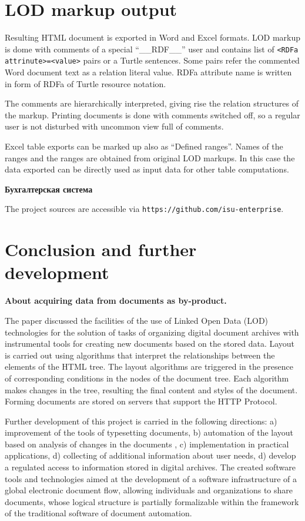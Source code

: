 \documentclass[conference,a4paper]{IEEEtran}
\providecommand\url[1]{\texttt{#1}}
\begin{document}
\section{LOD markup output}
\label{sec:lod-out}

Resulting HTML document is exported in Word and Excel formats.  LOD markup is dome with comments of a special ``\_\_RDF\_\_'' user and contains list of \texttt{<RDFa attrinute>=<value>} pairs or a Turtle sentences.  Some pairs refer the commented Word document text as a relation literal value.  RDFa attribute name is written in form of RDFa of Turtle resource notation.

The comments are hierarchically interpreted, giving rise the relation structures of the markup.  Printing documents is done with comments switched off, so a regular user is not disturbed with uncommon view full of comments.

Excel table exports can be marked up also as ``Defined ranges''.  Names of the ranges and the ranges are obtained from original LOD markups.  In this case the data exported can be directly used as input data for other table computations.

\textbf{Бухгалтерская система}

The project sources are accessible via \url{https://github.com/isu-enterprise}.

\section{Conclusion and further development}
\label{sec:conc}

\textbf{About acquiring data from documents as by-product.}

The paper discussed the facilities of the use of Linked Open Data (LOD) technologies for the solution of tasks of organizing digital document archives with instrumental tools for creating new documents based on the stored data.  Layout is carried out using algorithms that interpret the relationships between the elements of the HTML tree.  The layout algorithms are triggered in the presence of corresponding conditions in the nodes of the document tree. Each algorithm makes changes in the tree, resulting the final content and styles of the document. Forming documents are stored on servers that support the HTTP Protocol.

Further development of this project is carried in the following directions: a) improvement of the tools of typesetting documents, b) automation of the layout based on analysis of changes in the documents \cite{b2}, c) implementation in practical applications, d) collecting of additional information about user needs, d) develop a regulated access to information stored in digital archives. The created software tools and technologies aimed at the development of a software infrastructure of a global electronic document flow, allowing individuals and organizations to share documents, whose logical structure is partially formalizable within the framework of the traditional software of document automation.
\end{document}
